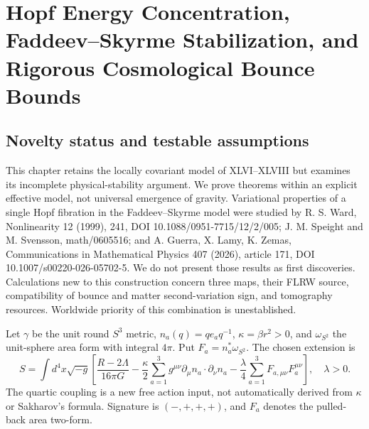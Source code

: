 \documentclass[11pt,a4paper,oneside]{book}
\begin{document}
\chapter{Hopf Energy Concentration, Faddeev--Skyrme Stabilization, and Rigorous Cosmological Bounce Bounds}
\section{Novelty status and testable assumptions}
This chapter retains the locally covariant model of XLVI--XLVIII but examines its incomplete physical-stability argument. We prove theorems within an explicit effective model, not universal emergence of gravity. Variational properties of a single Hopf fibration in the Faddeev--Skyrme model were studied by R. S. Ward, Nonlinearity 12 (1999), 241, DOI 10.1088/0951-7715/12/2/005; J. M. Speight and M. Svensson, math/0605516; and A. Guerra, X. Lamy, K. Zemas, Communications in Mathematical Physics 407 (2026), article 171, DOI 10.1007/s00220-026-05702-5. We do not present those results as first discoveries. Calculations new to this construction concern three maps, their FLRW source, compatibility of bounce and matter second-variation sign, and tomography resources. Worldwide priority of this combination is unestablished.

Let $\gamma$ be the unit round $S^3$ metric, $n_a(q)=qe_aq^{-1}$, $\kappa=\beta r^2>0$, and $\omega_{S^2}$ the unit-sphere area form with integral $4\pi$. Put $F_a=n_a^*\omega_{S^2}$. The chosen extension is
\begin{equation}S=\int d^4x\sqrt{-g}\left[\frac{R-2\Lambda}{16\pi G}-\frac\kappa2\sum_{a=1}^3g^{\mu\nu}\partial_\mu n_a\cdot\partial_\nu n_a-\frac\lambda4\sum_{a=1}^3F_{a,\mu\nu}F_a^{\mu\nu}\right],\quad\lambda>0.\tag{293}\end{equation}
The quartic coupling is a new free action input, not automatically derived from $\kappa$ or Sakharov's formula. Signature is $(-,+,+,+)$, and $F_a$ denotes the pulled-back area two-form.
\end{document}
